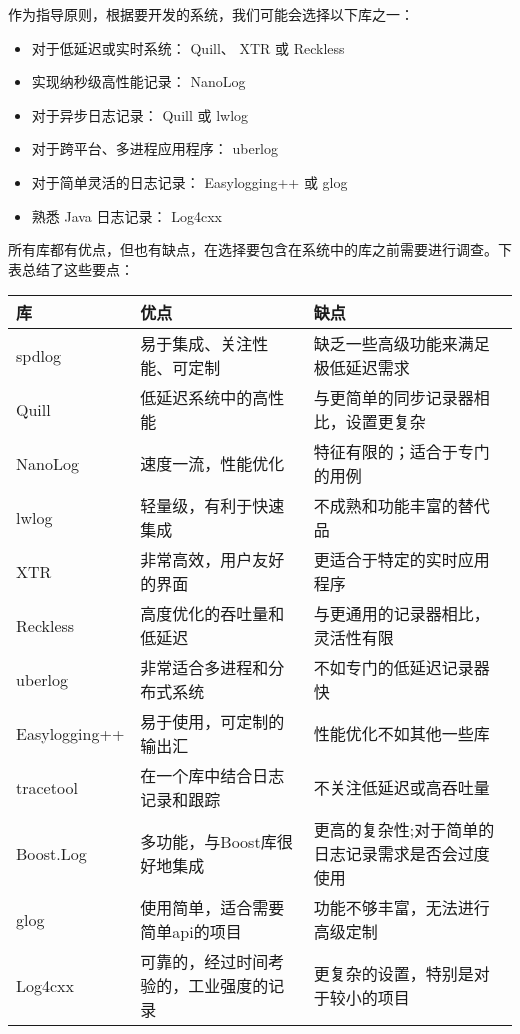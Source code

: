作为指导原则，根据要开发的系统，我们可能会选择以下库之一：

\begin{itemize}
\item
对于低延迟或实时系统： Quill、 XTR 或 Reckless

\item
实现纳秒级高性能记录： NanoLog

\item
对于异步日志记录： Quill 或 lwlog

\item
对于跨平台、多进程应用程序： uberlog

\item
对于简单灵活的日志记录： Easylogging++ 或 glog

\item
熟悉 Java 日志记录： Log4cxx
\end{itemize}

所有库都有优点，但也有缺点，在选择要包含在系统中的库之前需要进行调查。下表总结了这些要点：

\begin{longtable}{|l|l|l|}
\hline
\textbf{库}    & \textbf{优点}         & \textbf{缺点}               \\ \hline
\endfirsthead
%
\endhead
%
spdlog        & 易于集成、关注性能、可定制       & 缺乏一些高级功能来满足极低延迟需求         \\ \hline
Quill         & 低延迟系统中的高性能          & 与更简单的同步记录器相比，设置更复杂        \\ \hline
NanoLog       & 速度一流，性能优化           & 特征有限的；适合于专门的用例            \\ \hline
lwlog         & 轻量级，有利于快速集成         & 不成熟和功能丰富的替代品              \\ \hline
XTR           & 非常高效，用户友好的界面        & 更适合于特定的实时应用程序             \\ \hline
Reckless      & 高度优化的吞吐量和低延迟        & 与更通用的记录器相比，灵活性有限          \\ \hline
uberlog       & 非常适合多进程和分布式系统       & 不如专门的低延迟记录器快              \\ \hline
Easylogging++ & 易于使用，可定制的输出汇        & 性能优化不如其他一些库               \\ \hline
tracetool     & 在一个库中结合日志记录和跟踪      & 不关注低延迟或高吞吐量               \\ \hline
Boost.Log     & 多功能，与Boost库很好地集成    & 更高的复杂性;对于简单的日志记录需求是否会过度使用 \\ \hline
glog          & 使用简单，适合需要简单api的项目   & 功能不够丰富，无法进行高级定制           \\ \hline
Log4cxx       & 可靠的，经过时间考验的，工业强度的记录 & 更复杂的设置，特别是对于较小的项目         \\ \hline
\end{longtable}

